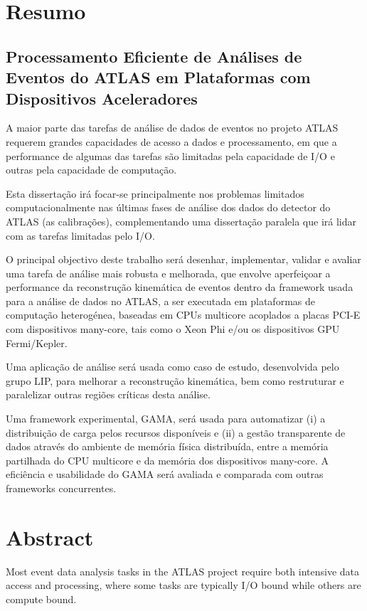 
\chapter*{Resumo}
\section*{Processamento Eficiente de Análises de Eventos do ATLAS em Plataformas com Dispositivos Aceleradores}

A maior parte das tarefas de análise de dados de eventos no projeto ATLAS requerem grandes capacidades de acesso a dados e processamento, em que a performance de algumas das tarefas são limitadas pela capacidade de I/O e outras pela capacidade de computação.

Esta dissertação irá focar-se principalmente nos problemas limitados computacionalmente nas últimas fases de análise dos dados do detector do ATLAS (as calibrações), complementando uma dissertação paralela que irá lidar com as tarefas limitadas pelo I/O.

O principal objectivo deste trabalho será desenhar, implementar, validar e avaliar uma tarefa de análise mais robusta e melhorada, que envolve aperfeiçoar a performance da reconstrução kinemática de eventos dentro da framework usada para a análise de dados no ATLAS, a ser executada em plataformas de computação heterogénea, baseadas em CPUs multicore acoplados a placas PCI-E com dispositivos many-core, tais como o \intel Xeon Phi e/ou os dispositivos GPU \nvidia Fermi/Kepler.

Uma aplicação de análise será usada como caso de estudo, desenvolvida pelo grupo LIP, para melhorar a reconstrução kinemática, bem como restruturar e paralelizar outras regiões críticas desta análise.

Uma framework experimental, GAMA, será usada para automatizar (i) a distribuição de carga pelos recursos disponíveis e (ii) a gestão transparente de dados através do ambiente de memória física distribuída, entre a memória partilhada do CPU multicore e da memória dos dispositivos many-core. A eficiência e usabilidade do GAMA será avaliada e comparada com outras frameworks concurrentes.

\newpage {}
\chapter*{Abstract}

Most event data analysis tasks in the ATLAS project require both intensive data access and processing, where some tasks are typically I/O bound while others are compute bound.

